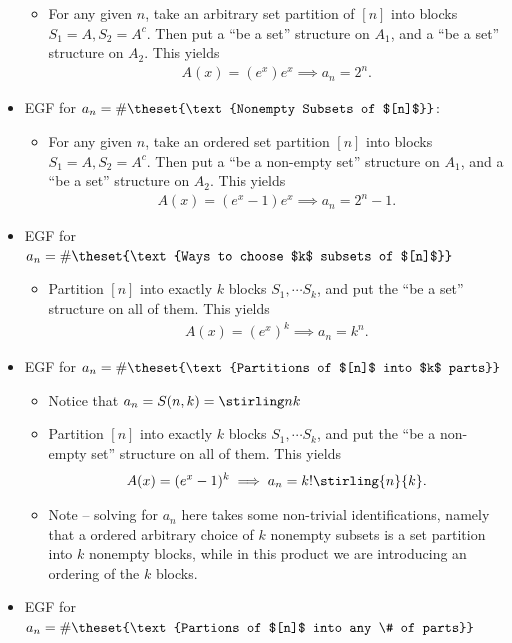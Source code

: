 \begin{itemize}
  \begin{itemize}
  \tightlist
  \item
    For any given \(n\), take an arbitrary set partition of \([n]\) into
    blocks \(S_1 = A, S_2 = A^c\). Then put a ``be a set'' structure on
    \(A_1\), and a ``be a set'' structure on \(A_2\). This yields
    \begin{align*}A(x) = (e^x)e^x \implies a_n = 2^n.\end{align*}
  \end{itemize}
\item
  EGF for \(a_n = \#\theset{\text{Nonempty Subsets of $[n]$}}\):

  \begin{itemize}
  \tightlist
  \item
    For any given \(n\), take an ordered set partition \([n]\) into
    blocks \(S_1 = A, S_2 = A^c\). Then put a ``be a non-empty set''
    structure on \(A_1\), and a ``be a set'' structure on \(A_2\). This
    yields
    \begin{align*}A(x) = (e^x - 1)e^x \implies a_n = 2^n - 1.\end{align*}
  \end{itemize}
\item
  EGF for
  \(a_n = \#\theset{\text{Ways to choose $k$ subsets of $[n]$}}\)

  \begin{itemize}
  \tightlist
  \item
    Partition \([n]\) into exactly \(k\) blocks \(S_1, \cdots S_k\), and
    put the ``be a set'' structure on all of them. This yields
    \begin{align*}A(x) = (e^x)^k \implies a_n = k^n.\end{align*}
  \end{itemize}
\item
  EGF for \(a_n = \#\theset{\text{Partitions of $[n]$ into $k$ parts}}\)

  \begin{itemize}
  \tightlist
  \item
    Notice that \(a_n = S(n, k) = \stirling n k\)
  \item
    Partition \([n]\) into exactly \(k\) blocks \(S_1, \cdots S_k\), and
    put the ``be a non-empty set'' structure on all of them. This yields
    \begin{align*}A(x) = (e^x-1)^k \implies a_n = k! \stirling{n}{k}.\end{align*}
  \item
    Note -- solving for \(a_n\) here takes some non-trivial
    identifications, namely that a ordered arbitrary choice of \(k\)
    nonempty subsets is a set partition into \(k\) nonempty blocks,
    while in this product we are introducing an ordering of the \(k\)
    blocks.
  \end{itemize}
\item
  EGF for
  \(a_n = \#\theset{\text{Partions of $[n]$ into any \# of parts}}\)


\end{itemize}
